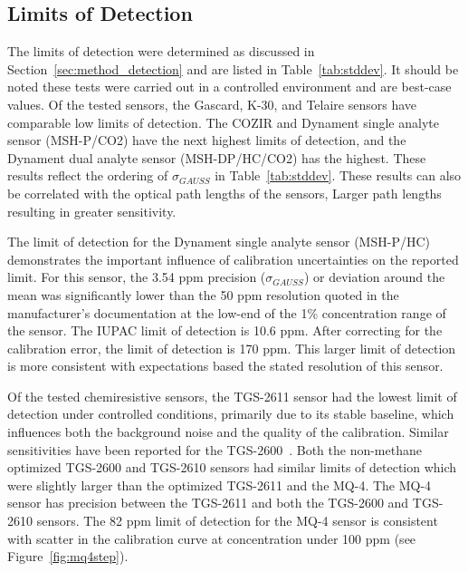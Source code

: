 \documentclass[sensors,article,submit,moreauthors,pdftex]{Definitions/mdpi}
\begin{document}
		\subsection{Limits of Detection}	
	
			The limits of detection were determined as discussed in Section~\ref{sec:method_detection} and are listed in Table~\ref{tab:stddev}.
			It should be noted these tests were carried out in a controlled environment and are best-case values.
			Of the tested  sensors, the Gascard, K-30, and Telaire sensors have comparable low limits of detection.
			The COZIR and Dynament single analyte sensor (MSH-P/CO2) have the next highest limits of detection, and the Dynament dual analyte sensor (MSH-DP/HC/CO2) has the highest.
			These results reflect the ordering of $\sigma_{GAUSS}$ in Table~\ref{tab:stddev}. These results can also be correlated with the optical path lengths of the sensors,  Larger path lengths resulting in greater sensitivity.
			
		
			The limit of detection for the Dynament single analyte  sensor (MSH-P/HC) demonstrates the important influence of calibration uncertainties on the reported limit.
			For this sensor, the 3.54 ppm precision ($\sigma_{GAUSS}$) or deviation around the mean was significantly lower than the 50 ppm resolution quoted in the manufacturer's documentation at the low-end of the 1\% concentration range of the sensor.
			The  IUPAC limit of detection is 10.6 ppm.  After correcting for the calibration error, the limit of detection is 170 ppm.  This larger limit of detection is more consistent with expectations based the stated resolution of this sensor. 
			
	
			Of the tested chemiresistive  sensors, the TGS-2611 sensor had the lowest limit of detection under controlled conditions, primarily due to its stable baseline, which influences both the background noise and the quality of the calibration.
			Similar sensitivities have been reported for the TGS-2600~\cite{eugster_performance_2012}.
			Both the non-methane optimized TGS-2600 and TGS-2610 sensors had similar limits of detection which were slightly larger than the  optimized TGS-2611 and the MQ-4.
			The MQ-4 sensor has precision between the TGS-2611 and both the TGS-2600 and TGS-2610 sensors.
			The 82 ppm limit of detection for the MQ-4 sensor is consistent with scatter in the calibration curve at concentration under 100 ppm (see Figure~\ref{fig:mq4step}).
			
\end{document}
